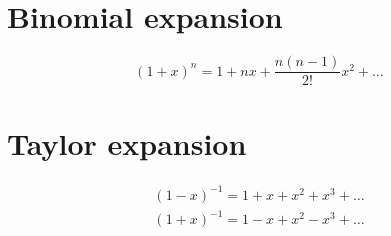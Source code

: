 \label{appendix2.series}

\ifpdf
\graphicspath{{Appendix2/figs/}}
\else
\graphicspath{{Appendix2/figs/}}
\fi

\section{Binomial expansion}
\begin{equation}
	(1 + x)^n = 1 + n x + \frac{n(n-1)}{2 !} x^2 + \ldots
\end{equation}

\section{Taylor expansion}
\begin{align}
	(1 - x)^{-1} = 1 + x + x^2 + x^3 + \ldots	\\
	(1 + x)^{-1} = 1 - x + x^2 - x^3 + \ldots
\end{align}

